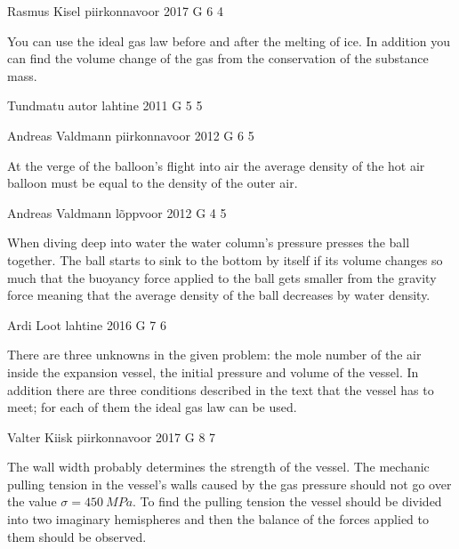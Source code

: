 \documentclass[11pt]{article}
\begin{document}
{Rasmus Kisel} %
{piirkonnavoor} %
{2017} %
{G 6} %
{4} %
{

\ifEngHint
You can use the ideal gas law before and after the melting of ice. In addition you can find the volume change of the gas from the conservation of the substance mass.
\fi
}

{Tundmatu autor} %
{lahtine} %
{2011} %
{G 5} %
{5} %
{

\ifEngHint
\fi
}

{Andreas Valdmann} %
{piirkonnavoor} %
{2012} %
{G 6} %
{5} %
{

\ifEngHint
At the verge of the balloon's flight into air the average density of the hot air balloon must be equal to the density of the outer air.
\fi
}

{Andreas Valdmann} %
{lõppvoor} %
{2012} %
{G 4} %
{5} %
{

\ifEngHint
When diving deep into water the water column's pressure presses the ball together. The ball starts to sink to the bottom by itself if its volume changes so much that the buoyancy force applied to the ball gets smaller from the gravity force meaning that the average density of the ball decreases by water density.
\fi
}

{Ardi Loot} %
{lahtine} %
{2016} %
{G 7} %
{6} %
{

\ifEngHint
There are three unknowns in the given problem: the mole number of the air inside the expansion vessel, the initial pressure and volume of the vessel. In addition there are three conditions described in the text that the vessel has to meet; for each of them the ideal gas law can be used.
\fi
}

{Valter Kiisk} %
{piirkonnavoor} %
{2017} %
{G 8} %
{7} %
{

\ifEngHint
The wall width probably determines the strength of the vessel. The mechanic pulling tension in the vessel's walls caused by the gas pressure should not go over the value $\sigma=\SI{450}{MPa}$. To find the pulling tension the vessel should be divided into two imaginary hemispheres and then the balance of the forces applied to them should be observed.
\fi
}
\end{document}
